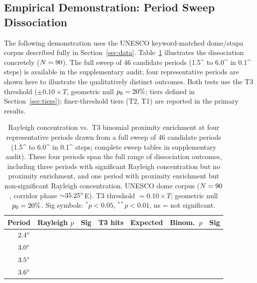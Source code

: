 \documentclass[12pt,a4paper]{article}
\newcommand{\degr}{\ifmmode^\circ\else\textdegree{}\fi}
\begin{document}
\subsection{Empirical Demonstration: Period Sweep Dissociation}

The following demonstration uses the UNESCO keyword-matched dome/stupa
corpus described fully in Section~\ref{sec:data}.
Table~\ref{tab:rayleigh_vs_binom} illustrates the dissociation
concretely ($N = 90{}$). The full sweep of 46 candidate periods
(1.5\degr{} to 6.0\degr{} in 0.1\degr{} steps) is available in the
supplementary audit; four representative periods are shown here to
illustrate the qualitatively distinct outcomes. Both tests use the T3 threshold
($\pm 0.10 \times T$, geometric null $p_0 = 20\%{}$; tiers defined in
Section~\ref{sec:tiers}); finer-threshold tiers (T2, T1) are reported
in the primary results.

\begin{table}[ht]
\centering
\caption{Rayleigh concentration vs.\ T3 binomial proximity
enrichment at four representative periods drawn from a full sweep of
46 candidate periods (1.5\degr{} to 6.0\degr{} in 0.1\degr{} steps;
complete sweep tables in supplementary audit). These four periods
span the full range of dissociation outcomes, including three periods
with significant Rayleigh concentration but no proximity enrichment, and
one period with proximity enrichment but non-significant Rayleigh concentration.
UNESCO dome corpus ($N = 90{}$, corridor phase ${\sim}35.25\degr$E).
T3 threshold $= 0.10 \times T$; geometric null $p_0 = 20\%{}$.
Sig symbols: $^{*}p < 0.05$, $^{**}p < 0.01$, ns = not significant.}
\label{tab:rayleigh_vs_binom}
\small
\begin{tabular}{rlcrrrl}
\toprule
Period & Rayleigh $p$ & Sig & T3 hits & Expected
       & Binom.\ $p$ & Sig \\
\midrule
$2.4\degr$ & \sweepRayleighPTwoFour{}  & \sweepRayleighSigTwoFour{}
           & \sweepHitsTwoFour{}  & \sweepExpectedTwoFour{}
           & \sweepBinomPTwoFour{}  & \sweepBinomSigTwoFour{} \\
$3.0\degr$ & \sweepRayleighPThreeZero{} & \sweepRayleighSigThreeZero{}
           & \sweepHitsThreeZero{} & \sweepExpectedThreeZero{}
           & \sweepBinomPThreeZero{} & \textbf{\sweepBinomSigThreeZero{}} \\
$3.5\degr$ & \sweepRayleighPThreeFive{} & \sweepRayleighSigThreeFive{}
           & \sweepHitsThreeFive{} & \sweepExpectedThreeFive{}
           & \sweepBinomPThreeFive{} & \sweepBinomSigThreeFive{} \\
$3.6\degr$ & \sweepRayleighPThreeSix{}  & \sweepRayleighSigThreeSix{}
           & \sweepHitsThreeSix{}  & \sweepExpectedThreeSix{}
           & \sweepBinomPThreeSix{}  & \sweepBinomSigThreeSix{} \\
\bottomrule
\end{tabular}
\end{table}
\end{document}
